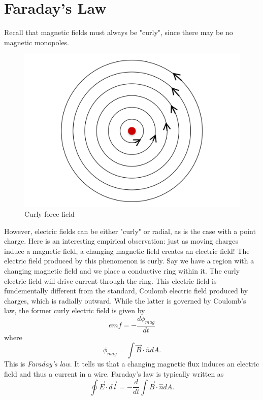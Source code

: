 \documentclass[nobib]{tufte-handout}
\begin{document}
\section{Faraday's Law}
Recall that magnetic fields must always be "curly", since there may 
be no magnetic monopoles. 
\begin{figure}
    \caption{Curly force field}
    \begin{center}
        \includegraphics{images/curly.png}
    \end{center}
\end{figure}
However, electric fields can be either "curly" or radial, 
as is the case with a point charge. Here is an interesting 
empirical observation: just as moving charges induce a 
magnetic field, a changing magnetic field creates an electric 
field! The electric field produced by this phenomenon is curly. 
Say we have a region with a changing magnetic field and we place
a conductive ring within it. The curly electric field will drive current 
through the ring.
This electric field is fundementally different from the standard, Coulomb 
electric field produced by charges, which is radially outward. 
While the latter is governed by Coulomb's law, the former curly electric field 
is given by 
\[emf = -\frac{d \phi_{mag}}{dt}\]
where 
\[\phi_{mag} = \int \vec{B} \cdot \hat{n} dA.\]
This is \emph{Faraday's law}. It tells us that a changing magnetic flux 
induces an electric field and thus a current in a wire. Faraday's law is 
typically written as 
\[\oint \vec{E} \cdot d\vec{l} = -\frac{d}{dt} \int \vec{B} \cdot \hat{n} dA.\]
\end{document}
